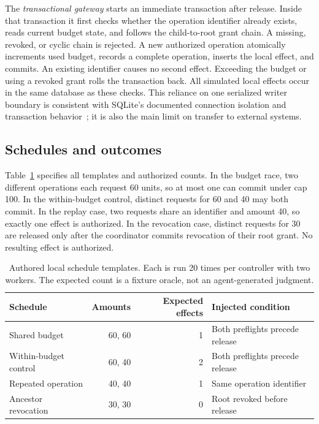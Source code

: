 \documentclass[manuscript,screen,nonacm]{acmart}
\begin{document}
The \emph{transactional gateway} starts an immediate transaction after release. Inside that transaction it first checks whether the operation identifier already exists, reads current budget state, and follows the child-to-root grant chain. A missing, revoked, or cyclic chain is rejected. A new authorized operation atomically increments used budget, records a complete operation, inserts the local effect, and commits. An existing identifier causes no second effect. Exceeding the budget or using a revoked grant rolls the transaction back. All simulated local effects occur in the same database as these checks. This reliance on one serialized writer boundary is consistent with SQLite's documented connection isolation and transaction behavior~\cite{sqliteisolation}; it is also the main limit on transfer to external systems.

\subsection{Schedules and outcomes}
Table~\ref{tab:schedules} specifies all templates and authorized counts. In the budget race, two different operations each request 60 units, so at most one can commit under cap 100. In the within-budget control, distinct requests for 60 and 40 may both commit. In the replay case, two requests share an identifier and amount 40, so exactly one effect is authorized. In the revocation case, distinct requests for 30 are released only after the coordinator commits revocation of their root grant. No resulting effect is authorized.

\begin{table}[t]
\centering
\caption{Authored local schedule templates. Each is run 20 times per controller with two workers. The expected count is a fixture oracle, not an agent-generated judgment.}
\label{tab:schedules}
\begin{tabular}{lrrl}
\toprule
Schedule & Amounts & Expected effects & Injected condition\\
\midrule
Shared budget & 60, 60 & 1 & Both preflights precede release\\
Within-budget control & 60, 40 & 2 & Both preflights precede release\\
Repeated operation & 40, 40 & 1 & Same operation identifier\\
Ancestor revocation & 30, 30 & 0 & Root revoked before release\\
\bottomrule
\end{tabular}
\end{table}
\end{document}
